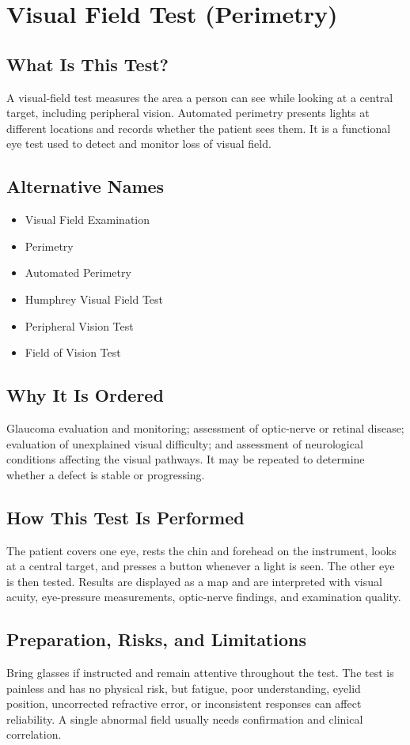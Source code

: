 \chapter{Visual Field Test (Perimetry)}

\section*{What Is This Test?}
A visual-field test measures the area a person can see while looking at a central target, including peripheral vision. Automated perimetry presents lights at different locations and records whether the patient sees them. It is a functional eye test used to detect and monitor loss of visual field.

\section*{Alternative Names}
\begin{itemize}
  \item Visual Field Examination
  \item Perimetry
  \item Automated Perimetry
  \item Humphrey Visual Field Test
  \item Peripheral Vision Test
  \item Field of Vision Test
\end{itemize}
\section*{Why It Is Ordered}
Glaucoma evaluation and monitoring; assessment of optic-nerve or retinal disease; evaluation of unexplained visual difficulty; and assessment of neurological conditions affecting the visual pathways. It may be repeated to determine whether a defect is stable or progressing.

\section*{How This Test Is Performed}
The patient covers one eye, rests the chin and forehead on the instrument, looks at a central target, and presses a button whenever a light is seen. The other eye is then tested. Results are displayed as a map and are interpreted with visual acuity, eye-pressure measurements, optic-nerve findings, and examination quality.

\section*{Preparation, Risks, and Limitations}
Bring glasses if instructed and remain attentive throughout the test. The test is painless and has no physical risk, but fatigue, poor understanding, eyelid position, uncorrected refractive error, or inconsistent responses can affect reliability. A single abnormal field usually needs confirmation and clinical correlation.

